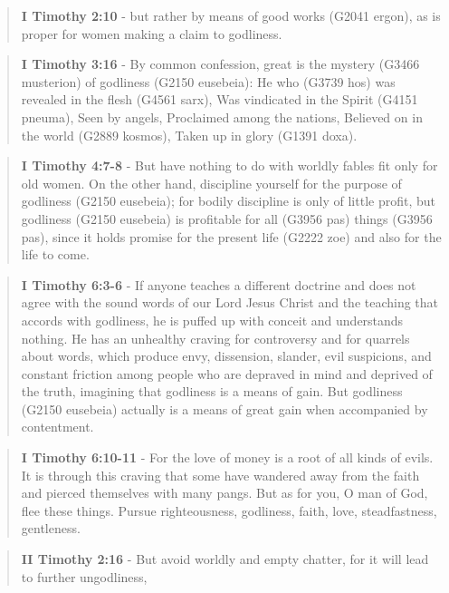 \documentclass[11pt]{article}
\begin{document}
\begin{quote}
\textbf{I Timothy 2:10} - but rather by means of good works (G2041 ergon), as is proper for women making a claim to godliness.
\end{quote}

\begin{quote}
\textbf{I Timothy 3:16} - By common confession, great is the mystery (G3466 musterion) of godliness (G2150 eusebeia): He who (G3739 hos) was revealed in the flesh (G4561 sarx), Was vindicated in the Spirit (G4151 pneuma), Seen by angels, Proclaimed among the nations, Believed on in the world (G2889 kosmos), Taken up in glory (G1391 doxa).
\end{quote}

\begin{quote}
\textbf{I Timothy 4:7-8} - But have nothing to do with worldly fables fit only for old women. On the other hand, discipline yourself for the purpose of godliness (G2150 eusebeia); for bodily discipline is only of little profit, but godliness (G2150 eusebeia) is profitable for all (G3956 pas) things (G3956 pas), since it holds promise for the present life (G2222 zoe) and also for the life to come.
\end{quote}

\begin{quote}
\textbf{I Timothy 6:3-6} - If anyone teaches a different doctrine and does not agree with the sound words of our Lord Jesus Christ and the teaching that accords with godliness, he is puffed up with conceit and understands nothing. He has an unhealthy craving for controversy and for quarrels about words, which produce envy, dissension, slander, evil suspicions, and constant friction among people who are depraved in mind and deprived of the truth, imagining that godliness is a means of gain. But godliness (G2150 eusebeia) actually is a means of great gain when accompanied by contentment.
\end{quote}

\begin{quote}
\textbf{I Timothy 6:10-11} - For the love of money is a root of all kinds of evils. It is through this craving that some have wandered away from the faith and pierced themselves with many pangs. But as for you, O man of God, flee these things. Pursue righteousness, godliness, faith, love, steadfastness, gentleness.
\end{quote}

\begin{quote}
\textbf{II Timothy 2:16} - But avoid worldly and empty chatter, for it will lead to further ungodliness,
\end{quote}
\end{document}

